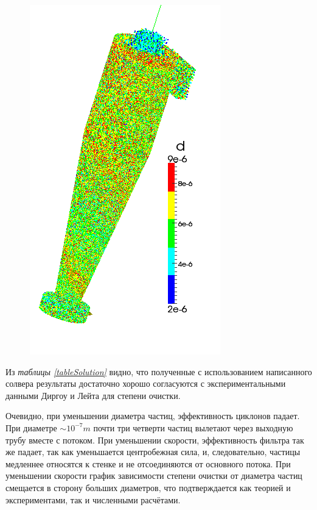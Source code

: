 \begin{figure}[h]
\begin{minipage}{0.2\linewidth}
	\end{minipage}
		\hspace{-1em}
	\begin{minipage}{0.2\linewidth}
		\includegraphics[scale=0.3]{t10}
	\end{minipage}
	\label{fig:t1}
\end{figure}
Из \textit{таблицы \ref{tableSolution}} видно, что полученные с использованием написанного солвера результаты достаточно хорошо согласуются с экспериментальными данными Диргоу и Лейта для степени очистки.

Очевидно, при уменьшении диаметра частиц, эффективность циклонов падает. При диаметре $ \sim 10^{-7}m$ почти три четверти частиц вылетают через выходную трубу вместе с потоком. При уменьшении скорости, эффективность фильтра так же падает, так как уменьшается центробежная сила, и, следовательно, частицы медленнее относятся к стенке и не отсоединяются от основного потока. При уменьшении скорости график зависимости степени очистки от диаметра частиц смещается в сторону больших диаметров, что подтверждается как теорией и экспериментами, так и численными расчётами.

